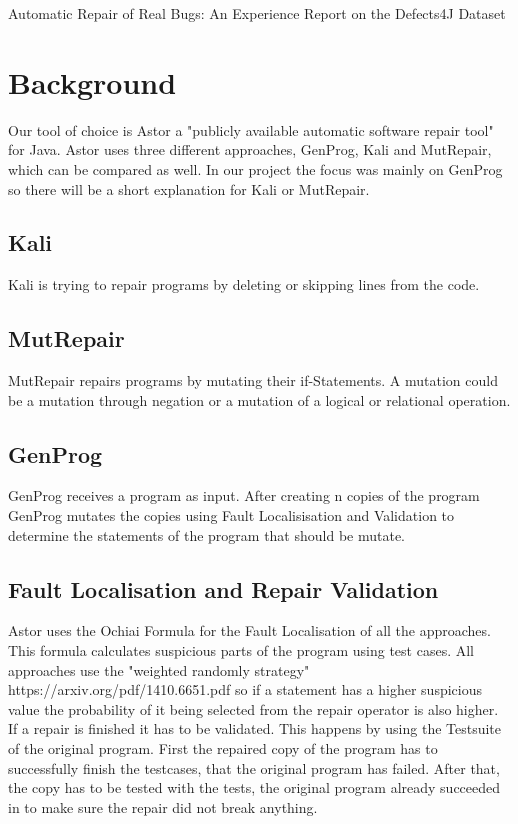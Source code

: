 \documentclass[pdftex,english,oribibl]{llncs}
\begin{document}
Automatic Repair of Real Bugs: An Experience Report on
the Defects4J Dataset\\


\section{Background}\label{sec:background}

Our tool of choice is Astor a "publicly available automatic software repair tool"  for Java. Astor uses three different approaches, GenProg, Kali and MutRepair, which can be compared as well. In our project the focus was mainly on GenProg so there will be a short explanation for Kali or MutRepair.\\
\subsection{Kali}
Kali is trying to repair programs by deleting or skipping lines from the code.
\subsection{MutRepair}
MutRepair repairs programs by mutating their if-Statements. A mutation could be a mutation through negation or a mutation of a logical or relational operation.
\subsection{GenProg}
GenProg receives a program as input. After creating n copies of the program GenProg mutates the copies using Fault Localisisation and Validation to determine the statements of the program that should be mutate.
\subsection{Fault Localisation and Repair Validation}
Astor uses the Ochiai Formula for the Fault Localisation of all the approaches. This formula calculates suspicious parts of the program using test cases. All approaches use the "weighted randomly strategy" https://arxiv.org/pdf/1410.6651.pdf so if a statement has a higher suspicious value the probability of it being selected from the repair operator is also higher.\\
If a repair is finished it has to be validated. This happens by using the Testsuite of the original program. First the repaired copy of the program has to successfully finish the testcases, that the original program has failed. After that, the copy has to be tested with the tests, the original program already succeeded in to make sure the repair did not break anything.
\end{document}
